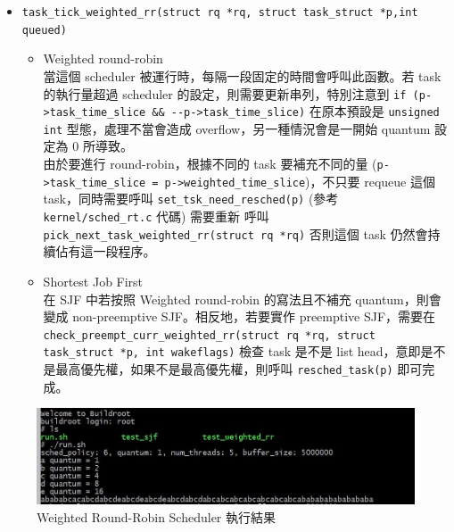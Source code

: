 \documentclass{res}
\begin{document}
\begin{resume}
\begin{itemize}
	\item
	\lstinline{task_tick_weighted_rr(struct rq *rq, struct task_struct *p,int queued)} \\
	\begin{itemize}
		\item Weighted round-robin \\
		當這個 scheduler 被運行時，每隔一段固定的時間會呼叫此函數。若 task 的執行量超過 scheduler 的設定，則需要更新串列，特別注意到 \lstinline{if (p->task_time_slice && --p->task_time_slice)} 在原本預設是 \lstinline{unsigned int} 型態，處理不當會造成 overflow，另一種情況會是一開始 quantum 設定為 0 所導致。 \\
		由於要進行 round-robin，根據不同的 task 要補充不同的量 (\lstinline{p->task_time_slice = p->weighted_time_slice})，不只要 requeue 這個 task，同時需要呼叫 \lstinline{set_tsk_need_resched(p)} (參考 \lstinline{kernel/sched_rt.c} 代碼) 需要重新 呼叫 \lstinline{pick_next_task_weighted_rr(struct rq *rq)} 否則這個 task 仍然會持續佔有這一段程序。
		\item Shortest Job First \\
		在 SJF 中若按照 Weighted round-robin 的寫法且不補充 quantum，則會變成 non-preemptive SJF。相反地，若要實作 preemptive SJF，需要在 \lstinline{check_preempt_curr_weighted_rr(struct rq *rq, struct task_struct *p, int wakeflags)} 檢查 task 是不是 list head，意即是不是最高優先權，如果不是最高優先權，則呼叫 \lstinline{resched_task(p)} 即可完成。
	\end{itemize}
\end{itemize}

\vspace*{.1in} 

\begin{figure}[htp]
    \begin{center}
        \includegraphics[width=400pt]{images/exp-weighted-rr.jpg}
        \caption{Weighted Round-Robin Scheduler 執行結果}
        \label{fig: result}
    \end{center}
\end{figure}


\end{resume}
\end{document}
